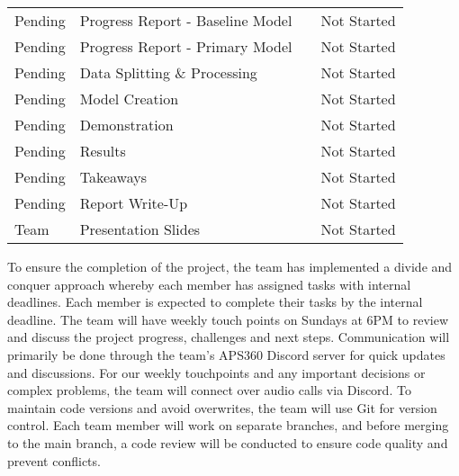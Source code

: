 \documentclass{article} %
\begin{document}
\begin{table}[h]
\begin{center}
\begin{tabular}{l|l|l|l}
Pending                & Progress Report - Baseline Model                   &                      & Not Started \\
Pending                & Progress Report - Primary Model                    &                      & Not Started \\
Pending                & Data Splitting \& Processing                       &                      & Not Started \\
Pending                & Model Creation                                     &                      & Not Started \\
Pending                & Demonstration                                      &                      & Not Started \\
Pending               & Results                                            &                      & Not Started \\
Pending               & Takeaways                                          &                      & Not Started \\
Pending                & Report Write-Up                                    &                      & Not Started \\
Team                & Presentation Slides                                &                      & Not Started \\
\hline
\end{tabular}
\end{center}
\end{table}

To ensure the completion of the project, the team has implemented a divide and conquer approach whereby each member has assigned tasks with internal deadlines. Each member is expected to complete their tasks by the internal deadline. The team will have weekly touch points on Sundays at 6PM to review  and discuss the project progress, challenges and next steps.
Communication will primarily be done through the team’s APS360 Discord server for quick updates and discussions. For our weekly touchpoints and any important decisions or complex problems, the team will connect over audio calls via Discord.
To maintain code versions and avoid overwrites, the team will use Git for version control. Each team member will work on separate branches, and before merging to the main branch, a code review will be conducted to ensure code quality and prevent conflicts.
\end{document}
